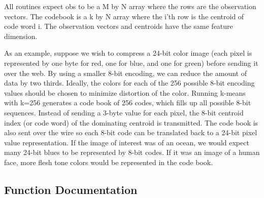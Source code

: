 \begin{DoxyVerb}
All routines expect obs to be a M by N array where the rows are
the observation vectors. The codebook is a k by N array where the
i'th row is the centroid of code word i. The observation vectors
and centroids have the same feature dimension.

As an example, suppose we wish to compress a 24-bit color image
(each pixel is represented by one byte for red, one for blue, and
one for green) before sending it over the web.  By using a smaller
8-bit encoding, we can reduce the amount of data by two
thirds. Ideally, the colors for each of the 256 possible 8-bit
encoding values should be chosen to minimize distortion of the
color. Running k-means with k=256 generates a code book of 256
codes, which fills up all possible 8-bit sequences.  Instead of
sending a 3-byte value for each pixel, the 8-bit centroid index
(or code word) of the dominating centroid is transmitted. The code
book is also sent over the wire so each 8-bit code can be
translated back to a 24-bit pixel value representation. If the
image of interest was of an ocean, we would expect many 24-bit
blues to be represented by 8-bit codes. If it was an image of a
human face, more flesh tone colors would be represented in the
code book.\end{DoxyVerb}
 

\subsection{Function Documentation}
\hypertarget{namespacescipy_1_1cluster_1_1vq_af4bfedf7fde3d48032d839db0477faa1}{}
